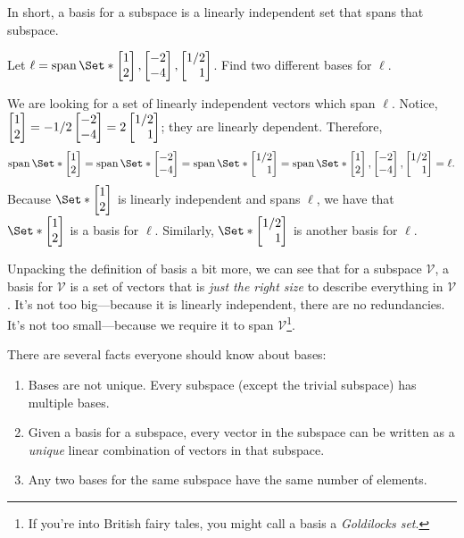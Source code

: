 
In short, a basis for a subspace is a linearly independent set that spans that
subspace.

\begin{example}
	\label{EXLINEBASIS}
	Let $\ell=\Span\Set*{\mat{1\\2},\mat{-2\\-4}, \mat{1/2\\1}}$. Find
	two different bases for $\ell$.
	
	We are looking for a set of linearly independent vectors which span $\ell$.
	Notice, $\mat{1\\2} = -1/2\mat{-2\\-4} = 2\mat{1/2\\1}$;
	they are linearly dependent. 
	Therefore,
    \[
		\Span\Set*{\mat{1\\2}} =
		\Span\Set*{\mat{-2\\-4}} =
		\Span\Set*{\mat{1/2\\1}} =
		\Span\Set*{\mat{1\\2},\mat{-2\\-4}, \mat{1/2\\1}} =
		\ell.
	\]
	Because $\Set*{\mat{1\\2}}$ is linearly independent and spans $\ell$,
	we have that $\Set*{\mat{1\\2}}$ is a basis for $\ell$.
	Similarly, $\Set*{\mat{1/2\\1}}$ is another basis for $\ell$.
\end{example}

Unpacking the definition of basis a bit more, we can see that for a 
subspace $\mathcal V$, a basis for $\mathcal V$ is a set of vectors
that is \emph{just the right size} to describe everything in $\mathcal V$.
It's not too big---because it is linearly independent, there are no
redundancies. It's not too small---because we require it to span $\mathcal V$\footnote{ 
If you're into British fairy tales, you might call a basis a \emph{Goldilocks set}.
}.

There are several facts everyone should know about bases:
\begin{enumerate}
	\item Bases are not unique. Every subspace (except the trivial subspace)
		has multiple bases.
	\item Given a basis for a subspace, every vector in the subspace can be written
		as a \emph{unique} linear combination of vectors in that subspace.
	\item Any two bases for the same subspace have the same number of elements.
\end{enumerate}

